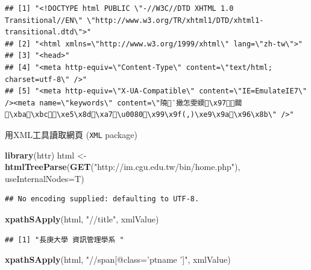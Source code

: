 \documentclass[]{book}
\newenvironment{Shaded}{\begin{snugshade}}{\end{snugshade}}
\newcommand{\KeywordTok}[1]{\textcolor[rgb]{0.13,0.29,0.53}{\textbf{{#1}}}}
\newcommand{\DataTypeTok}[1]{\textcolor[rgb]{0.13,0.29,0.53}{{#1}}}
\newcommand{\StringTok}[1]{\textcolor[rgb]{0.31,0.60,0.02}{{#1}}}
\newcommand{\NormalTok}[1]{{#1}}
\theoremstyle{definition}
\theoremstyle{definition}
\theoremstyle{remark}
\begin{document}
\begin{verbatim}
## [1] "<!DOCTYPE html PUBLIC \"-//W3C//DTD XHTML 1.0 Transitional//EN\" \"http://www.w3.org/TR/xhtml1/DTD/xhtml1-transitional.dtd\">"                                                             
## [2] "<html xmlns=\"http://www.w3.org/1999/xhtml\" lang=\"zh-tw\">"                                                                                                                              
## [3] "<head>"                                                                                                                                                                                    
## [4] "<meta http-equiv=\"Content-Type\" content=\"text/html; charset=utf-8\" />"                                                                                                                 
## [5] "<meta http-equiv=\"X-UA-Compatible\" content=\"IE=EmulateIE7\" /><meta name=\"keywords\" content=\"隢‵撖怎雯蝡\x97閮\xba\xbc\xe5\x8d\xa7\u0080\x99\x9f(,)\xe9\x9a\x96\x8b\" />"
\end{verbatim}

用XML工具讀取網頁 (\texttt{XML} package)

\begin{Shaded}
\begin{Highlighting}[]
\KeywordTok{library}\NormalTok{(httr)}
\NormalTok{html <-}\StringTok{ }\KeywordTok{htmlTreeParse}\NormalTok{(}\KeywordTok{GET}\NormalTok{(}\StringTok{"http://im.cgu.edu.tw/bin/home.php"}\NormalTok{), }\DataTypeTok{useInternalNodes=}\NormalTok{T)}
\end{Highlighting}
\end{Shaded}

\begin{verbatim}
## No encoding supplied: defaulting to UTF-8.
\end{verbatim}

\begin{Shaded}
\begin{Highlighting}[]
\KeywordTok{xpathSApply}\NormalTok{(html, }\StringTok{"//title"}\NormalTok{, xmlValue)}
\end{Highlighting}
\end{Shaded}

\begin{verbatim}
## [1] "長庚大學 資訊管理學系 "
\end{verbatim}

\begin{Shaded}
\begin{Highlighting}[]
\KeywordTok{xpathSApply}\NormalTok{(html, }\StringTok{"//span[@class='ptname ']"}\NormalTok{, xmlValue)}
\end{Highlighting}
\end{Shaded}
\end{document}
